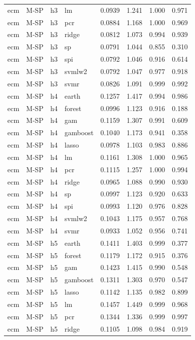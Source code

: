 \begin{ThreePartTable}
\begin{longtable}[t]{llclcccc}
ecm & M-SP & h3 & lm & 0.0939 & 1.241 & 1.000 & 0.971\\
ecm & M-SP & h3 & pcr & 0.0884 & 1.168 & 1.000 & 0.969\\
ecm & M-SP & h3 & ridge & 0.0812 & 1.073 & 0.994 & 0.939\\
ecm & M-SP & h3 & sp & 0.0791 & 1.044 & 0.855 & 0.310\\
ecm & M-SP & h3 & spi & 0.0792 & 1.046 & 0.916 & 0.614\\
ecm & M-SP & h3 & svmlw2 & 0.0792 & 1.047 & 0.977 & 0.918\\
ecm & M-SP & h3 & svmr & 0.0826 & 1.091 & 0.999 & 0.992\\
\addlinespace
ecm & M-SP & h4 & earth & 0.1257 & 1.417 & 0.994 & 0.986\\
ecm & M-SP & h4 & forest & 0.0996 & 1.123 & 0.916 & 0.188\\
ecm & M-SP & h4 & gam & 0.1159 & 1.307 & 0.991 & 0.609\\
ecm & M-SP & h4 & gamboost & 0.1040 & 1.173 & 0.941 & 0.358\\
ecm & M-SP & h4 & lasso & 0.0978 & 1.103 & 0.983 & 0.886\\
ecm & M-SP & h4 & lm & 0.1161 & 1.308 & 1.000 & 0.965\\
ecm & M-SP & h4 & pcr & 0.1115 & 1.257 & 1.000 & 0.994\\
ecm & M-SP & h4 & ridge & 0.0965 & 1.088 & 0.990 & 0.930\\
ecm & M-SP & h4 & sp & 0.0997 & 1.123 & 0.920 & 0.633\\
ecm & M-SP & h4 & spi & 0.0993 & 1.120 & 0.976 & 0.828\\
ecm & M-SP & h4 & svmlw2 & 0.1043 & 1.175 & 0.957 & 0.768\\
ecm & M-SP & h4 & svmr & 0.0933 & 1.052 & 0.956 & 0.741\\
\addlinespace
ecm & M-SP & h5 & earth & 0.1411 & 1.403 & 0.999 & 0.377\\
ecm & M-SP & h5 & forest & 0.1179 & 1.172 & 0.915 & 0.376\\
ecm & M-SP & h5 & gam & 0.1423 & 1.415 & 0.990 & 0.548\\
ecm & M-SP & h5 & gamboost & 0.1311 & 1.303 & 0.970 & 0.547\\
ecm & M-SP & h5 & lasso & 0.1142 & 1.135 & 0.982 & 0.899\\
ecm & M-SP & h5 & lm & 0.1457 & 1.449 & 0.999 & 0.968\\
ecm & M-SP & h5 & pcr & 0.1344 & 1.336 & 0.999 & 0.997\\
ecm & M-SP & h5 & ridge & 0.1105 & 1.098 & 0.984 & 0.919\\

\end{longtable}
\end{ThreePartTable}
